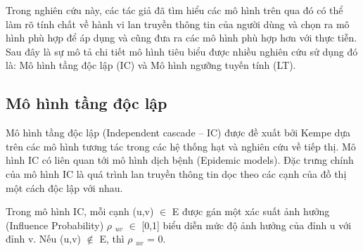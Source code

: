 Trong nghiên cứu này, các tác giả đã tìm hiểu các mô hình trên qua đó có thể làm rõ tính chất về hành vi lan truyền thông tin của người dùng và chọn ra mô hình phù hợp để áp dụng và cũng đưa ra các mô hình phù hợp hơn với thực tiễn. Sau đây là sự mô tả chi tiết mô hình tiêu biểu được nhiều nghiên cứu sử dụng đó là: Mô hình tầng độc lập (IC) và Mô hình ngưỡng tuyến tính (LT).
	\subsection{Mô hình tầng độc lập}
	Mô hình tầng độc lập (Independent cascade – IC) được đề xuất bởi Kempe \cite{kemple1} dựa trên các mô hình tương tác trong các hệ thống hạt và nghiên cứu về tiếp thị. Mô hình IC có liên quan tới mô hình dịch bệnh (Epidemic models). Đặc trưng chính của mô hình IC là quá trình lan truyền thông tin dọc theo các cạnh của đồ thị một cách độc lập với nhau.
	
	Trong mô hình IC, mỗi cạnh (u,v) $\in$ E được gán một xác suất ảnh hưởng (Influence Probability) $\rho$ $_{uv}$ $\in$ [0,1] biểu diễn mức độ ảnh hưởng của đỉnh u với đỉnh v. Nếu (u,v) $\notin$ E, thì $\rho$ $_{uv}$ = 0.
	
